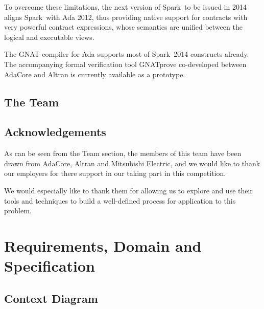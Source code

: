 \documentclass{report}
\newcommand{\spark}[0]{{\sc Spark}}
\begin{document}
To overcome these limitations, the next version of \spark\ to be
issued in 2014 aligns \spark\ with Ada 2012, thus providing native
support for contracts with very powerful contract expressions, whose
semantics are unified between the logical and executable views.

The GNAT compiler for Ada supports most of \spark\ 2014 constructs
already.  The accompanying formal verification tool GNATprove
co-developed between AdaCore and Altran is currently available as a
prototype.

\section{The Team}


\section{Acknowledgements}
As can be seen from the Team section, the members of this team have
been drawn from AdaCore, Altran and Mitsubishi Electric, and we would
like to thank our employers for there support in our taking part in
this competition.

We would especially like to thank them for allowing us to explore and
use their tools and techniques to build a well-defined process for
application to this problem.




\chapter{Requirements, Domain and Specification}
\section{Context Diagram}
\begin{center}
\end{center}
\end{document}
